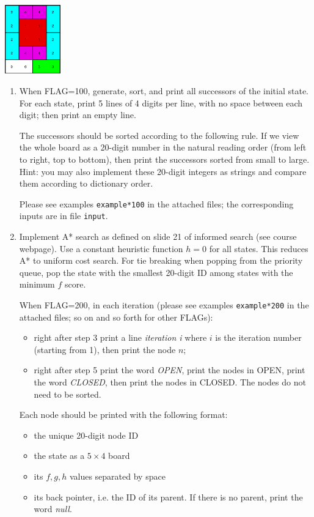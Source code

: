 \documentclass[10pt,a4paper]{article}
\begin{document}
\centerline{\includegraphics[width=0.18\textwidth]{figure_15.eps}}

\begin{enumerate}

\item When FLAG=100, generate, sort, and print all successors of the initial state. For each state, print 5 lines of 4 digits per line, with no space between each digit; then print an empty line. 

The successors should be sorted according to the following rule.
If we view the whole board as a 20-digit number in the natural reading order (from left to right, top to bottom), then 
print the successors sorted from small to large.
Hint: you may also implement these 20-digit integers as strings and compare them according to dictionary order.

Please see examples \verb|example*100| in the attached files; the corresponding inputs are in file \verb|input|. 

\item 
Implement A* search as defined on slide 21 of informed search (see course webpage). Use a constant heuristic function $h=0$ for all states. This reduces A* to uniform cost search. 
For tie breaking when popping from the priority queue, pop the state with the smallest 20-digit ID among states with the minimum $f$ score.

When FLAG=200, in each iteration (please see examples \verb|example*200| in the attached files; so on and so forth for other FLAGs): 
\begin{itemize}
\item right after step 3 print a line \emph{iteration i} where $i$ is the iteration number (starting from 1), then print the node $n$;
\item right after step 5 print the word \emph{OPEN}, print the nodes in OPEN, print the word \emph{CLOSED}, then print the nodes in CLOSED.  The nodes do not need to be sorted.
\end{itemize}
Each node should be printed with the following format:
\begin{itemize}
\item the unique 20-digit node ID
\item the state as a $5\times4$ board
\item its $f, g, h$ values separated by space
\item its back pointer, i.e. the ID of its parent.  If there is no parent, print the word \emph{null}.
\end{itemize}




\end{enumerate}
\end{document}
